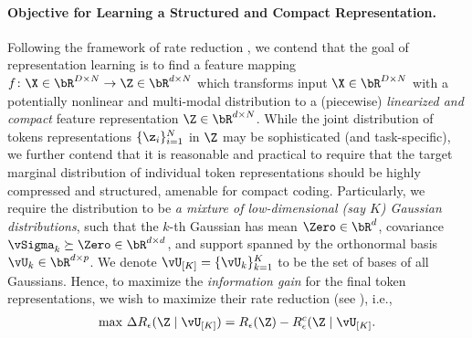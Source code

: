 \documentclass[../../book-main.tex]{subfiles}
\begin{document}
 
\paragraph{Objective for Learning a Structured and Compact Representation.}
Following the framework of rate reduction , we contend
that the goal of representation learning is to find a feature mapping \(f
\colon \X \in \bR^{D \times N} \to \Z\in \bR^{d \times N}\) which transforms input  \(\X \in \bR^{D \times N}\) with a potentially nonlinear and multi-modal distribution to a (piecewise) \textit{linearized and compact} feature representation \(\Z \in \bR^{d \times N}\). While the joint distribution of tokens representations \(\{\z_{i}\}_{i = 1}^{N}\) in \(\Z\) may be sophisticated (and task-specific), we further contend that it is reasonable and practical to
require that the target marginal distribution of individual token representations should be highly compressed and structured, amenable for compact coding. Particularly, we require the distribution to be \textit{a mixture of low-dimensional (say \(K\)) Gaussian
distributions}, such that the \(k\)-th Gaussian has mean \(\Zero \in \bR^{d}\), covariance \(\vSigma_{k} \succeq \Zero \in \bR^{d \times d}\), and support spanned by the orthonormal basis \(\vU_{k} \in \bR^{d \times p}\). 
We denote $\vU_{[K]} = \{\vU_k\}_{k=1}^K$ to be the set of bases of all Gaussians. Hence, to maximize the \textit{information gain} \cite{ma2022principles} for the final token representations, we wish to maximize their rate reduction (see ), i.e., 
\begin{align}\label{eq:rate reduction}
    \mathrm{max}\ \Delta R_{\epsilon}(\Z \mid \vU_{[K]}) = R_{\epsilon}(\Z) - R^c_{\epsilon}(\Z \mid \vU_{[K]}.
\end{align}
\end{document}
